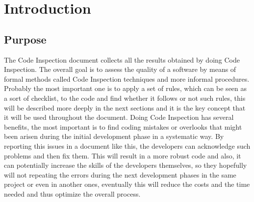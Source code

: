 \newpage
\section{Introduction}
\subsection{Purpose}
The Code Inspection document collects all the results obtained by doing Code Inspection. The overall goal is to assess the quality of a software by means of formal methods called Code Inspection techniques and more informal procedures. \newline
Probably the most important one is to apply a set of rules, which can be seen as a sort of checklist, to the code and find whether it follows or not such rules, this will be described more deeply in the next sections and it is the key concept that it will be used throughout the document. \newline
Doing Code Inspection has several benefits, the most important is to find coding mistakes or overlooks that might been arisen during the initial development phase in a systematic way. By reporting this issues in a document like this, the developers can acknowledge such problems and then fix them. This will result in a more robust code and also, it can potentially increase the skills of the developers themselves, so they hopefully will not repeating the errors during the next development phases in the same project or even in another ones, eventually this will reduce the costs and the time needed and thus optimize the overall process.
